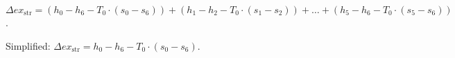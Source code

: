 \( \Delta ex_{\text{str}} = (h_0 - h_6 - T_0 \cdot (s_0 - s_6)) + (h_1 - h_2 - T_0 \cdot (s_1 - s_2)) + \ldots + (h_5 - h_6 - T_0 \cdot (s_5 - s_6)) \).  

Simplified:  
\( \Delta ex_{\text{str}} = h_0 - h_6 - T_0 \cdot (s_0 - s_6) \).